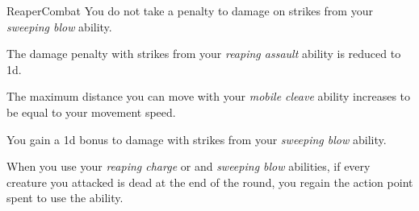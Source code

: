 \begin{feat}{Reaper}{Combat}
         You do not take a penalty to damage on strikes from your  \textit{sweeping blow} ability.

         The damage penalty with strikes from your \textit{reaping assault} ability is reduced to \minus1d.

         The maximum distance you can move with your \textit{mobile cleave} ability increases to be equal to your movement speed.

         You gain a \plus1d bonus to damage with strikes from your \textit{sweeping blow} ability.

         When you use your \textit{reaping charge} or and \textit{sweeping blow} abilities, if every creature you attacked is dead at the end of the round, you regain the action point spent to use the ability.
    \end{feat}

